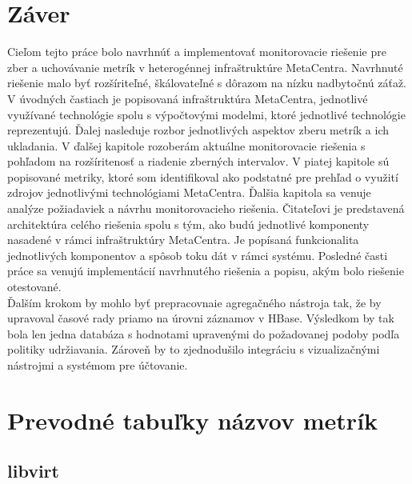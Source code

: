 \documentclass[printed,11pt,twoside,color,cover,table]{fithesis3}
\begin{document}
\chapter{Záver}
Cieľom tejto práce bolo navrhnúť a implementovať monitorovacie riešenie pre zber a uchovávanie metrík v heterogénnej infraštruktúre MetaCentra. 
Navrhnuté riešenie malo byť rozšíriteľné, škálovateľné  s dôrazom na nízku nadbytočnú záťaž.
\\V úvodných častiach je popisovaná infraštruktúra MetaCentra, jednotlivé využívané technológie spolu s výpočtovými modelmi, ktoré
jednotlivé technológie reprezentujú. Ďalej nasleduje rozbor jednotlivých aspektov zberu metrík a ich ukladania.
V ďalšej kapitole rozoberám aktuálne monitorovacie riešenia s pohľadom na rozšíritenosť a riadenie zberných intervalov. V piatej kapitole
sú popisované metriky, ktoré som identifikoval ako podstatné pre prehľad o využití zdrojov jednotlivými technológiami MetaCentra.
Ďalšia kapitola sa venuje analýze požiadaviek a návrhu monitorovacieho riešenia. Čitateľovi je predstavená architektúra celého 
riešenia spolu s tým, ako budú jednotlivé komponenty nasadené v rámci infraštruktúry MetaCentra. Je popísaná funkcionalita
jednotlivých komponentov a spôsob toku dát v rámci systému. Posledné časti práce sa venujú implementácií navrhnutého riešenia a popisu,
akým bolo riešenie otestované.
\\Ďalším krokom by mohlo byť prepracovnaie agregačného 
nástroja tak, že by upravoval časové rady priamo na úrovni záznamov v HBase. Výsledkom by tak bola len jedna databáza s hodnotami upravenými
do požadovanej podoby podľa politiky udržiavania. Zároveň by to zjednodušilo integráciu s vizualizačnými nástrojmi a systémom pre účtovanie.

\printbibliography[heading=bibintoc]

\appendix
\chapter{Prevodné tabuľky názvov metrík}
\section{libvirt}
\end{document}
